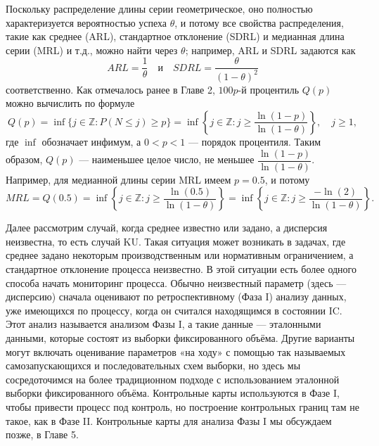 Поскольку распределение длины серии геометрическое, оно полностью характеризуется вероятностью успеха \(\theta\), и потому все свойства распределения, такие как среднее (ARL), стандартное отклонение (SDRL) и медианная длина серии (MRL) и т.д., можно найти через \(\theta\); например, ARL и SDRL задаются как
\[
	ARL = \frac{1}{\theta} \quad\text{и}\quad SDRL = \frac{\theta}{(1 - \theta)^2}
\]
соответственно. Как отмечалось ранее в Главе 2, \(100p\)-й процентиль \(Q(p)\) можно вычислить по формуле
\[
	Q(p) = \inf\{j \in \mathbb{Z} : P(N \le j) \ge p\}
	     = \inf\left\{j \in \mathbb{Z} : j \ge \frac{\ln(1 - p)}{\ln(1 - \theta)}\right\}, \quad j \ge 1,
\]
где \(\inf\) обозначает инфимум, а \(0 < p < 1\) — порядок процентиля. Таким образом, \(Q(p)\) — наименьшее целое число, не меньшее \(\dfrac{\ln(1 - p)}{\ln(1 - \theta)}\). Например, для медианной длины серии MRL имеем \(p = 0.5\), и потому
\[
	MRL = Q(0.5) = \inf\left\{j \in \mathbb{Z} : j \ge \frac{\ln(0.5)}{\ln(1 - \theta)}\right\}
	    = \inf\left\{j \in \mathbb{Z} : j \ge \frac{-\ln(2)}{\ln(1 - \theta)}\right\}.
\]

Далее рассмотрим случай, когда среднее известно или задано, а дисперсия неизвестна, то есть случай KU. Такая ситуация может возникать в задачах, где среднее задано некоторым производственным или нормативным ограничением, а стандартное отклонение процесса неизвестно. В этой ситуации есть более одного способа начать мониторинг процесса. Обычно неизвестный параметр (здесь — дисперсию) сначала оценивают по ретроспективному (Фаза I) анализу данных, уже имеющихся по процессу, когда он считался находящимся в состоянии IC. Этот анализ называется анализом Фазы I, а такие данные — эталонными данными, которые состоят из выборки фиксированного объёма. Другие варианты могут включать оценивание параметров «на ходу» с помощью так называемых самозапускающихся и последовательных схем выборки, но здесь мы сосредоточимся на более традиционном подходе с использованием эталонной выборки фиксированного объёма. Контрольные карты используются в Фазе I, чтобы привести процесс под контроль, но построение контрольных границ там не такое, как в Фазе II. Контрольные карты для анализа Фазы I мы обсуждаем позже, в Главе 5.

